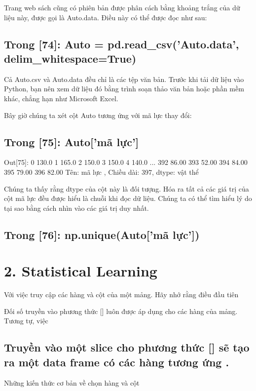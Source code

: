 Trang web sách cũng có phiên bản được phân cách bằng khoảng trắng của dữ liệu này, được gọi là Auto.data. Điều này có thể được đọc như sau:

\subsection{Trong [74]: Auto = pd.read\_csv('Auto.data', delim\_whitespace=True)}

Cả Auto.csv và Auto.data đều chỉ là các tệp văn bản. Trước khi tải dữ liệu vào Python, bạn nên xem dữ liệu đó bằng trình soạn thảo văn bản hoặc phần mềm khác, chẳng hạn như Microsoft Excel.

Bây giờ chúng ta xét cột Auto tương ứng với mã lực thay đổi:

\subsection{Trong [75]: Auto['mã lực']}

Out[75]: 0 130.0 1 165.0 2 150.0 3 150.0 4 140.0 ... 392 86.00 393 52.00 394 84.00 395 79.00 396 82.00 Tên: mã lực , Chiều dài: 397, dtype: vật thể

Chúng ta thấy rằng dtype của cột này là đối tượng. Hóa ra tất cả các giá trị của cột mã lực đều được hiểu là chuỗi khi đọc dữ liệu. Chúng ta có thể tìm hiểu lý do tại sao bằng cách nhìn vào các giá trị duy nhất.

\subsection{Trong [76]: np.unique(Auto['mã lực'])}

\section{2. Statistical Learning}

Với việc truy cập các hàng và cột của một mảng. Hãy nhớ rằng điều đầu tiên

Đối số truyền vào phương thức [] luôn được áp dụng cho các hàng của mảng. Tương tự, việc

\subsection{Truyền vào một slice cho phương thức [] sẽ tạo ra một data frame có các hàng tương ứng .}

Những kiến thức cơ bản về chọn hàng và cột

